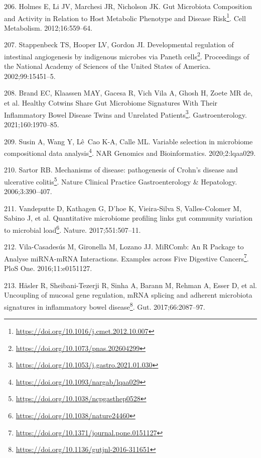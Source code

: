 \documentclass[
  a4paper,
]{book}
\DeclareRobustCommand{\href}[2]{#2\footnote{\url{#1}}}
\newlength{\cslhangindent}
\newlength{\cslentryspacingunit} %
\newenvironment{CSLReferences}[2] %
 {%
  \setlength{\parindent}{0pt}
  \ifodd #1
  \let\oldpar\par
  \def\par{\hangindent=\cslhangindent\oldpar}
  \fi
  \setlength{\parskip}{#2\cslentryspacingunit}
 }%
 {}
\begin{document}
\begin{CSLReferences}{0}{0}
\leavevmode{}%
206. Holmes E, Li JV, Marchesi JR, Nicholson JK. \href{https://doi.org/10.1016/j.cmet.2012.10.007}{Gut Microbiota Composition and Activity in Relation to Host Metabolic Phenotype and Disease Risk}. Cell Metabolism. 2012;16:559--64.

\leavevmode{}%
207. Stappenbeck TS, Hooper LV, Gordon JI. \href{https://doi.org/10.1073/pnas.202604299}{Developmental regulation of intestinal angiogenesis by indigenous microbes via Paneth cells}. Proceedings of the National Academy of Sciences of the United States of America. 2002;99:15451--5.

\leavevmode{}%
208. Brand EC, Klaassen MAY, Gacesa R, Vich Vila A, Ghosh H, Zoete MR de, et al. \href{https://doi.org/10.1053/j.gastro.2021.01.030}{Healthy Cotwins Share Gut Microbiome Signatures With Their Inflammatory Bowel Disease Twins and Unrelated Patients}. Gastroenterology. 2021;160:1970--85.

\leavevmode{}%
209. Susin A, Wang Y, Lê~Cao K-A, Calle ML. \href{https://doi.org/10.1093/nargab/lqaa029}{Variable selection in microbiome compositional data analysis}. NAR Genomics and Bioinformatics. 2020;2:lqaa029.

\leavevmode{}%
210. Sartor RB. \href{https://doi.org/10.1038/ncpgasthep0528}{Mechanisms of disease: pathogenesis of Crohn's disease and ulcerative colitis}. Nature Clinical Practice Gastroenterology \& Hepatology. 2006;3:390--407.

\leavevmode{}%
211. Vandeputte D, Kathagen G, D'hoe K, Vieira-Silva S, Valles-Colomer M, Sabino J, et al. \href{https://doi.org/10.1038/nature24460}{Quantitative microbiome profiling links gut community variation to microbial load}. Nature. 2017;551:507--11.

\leavevmode{}%
212. Vila-Casadesús M, Gironella M, Lozano JJ. \href{https://doi.org/10.1371/journal.pone.0151127}{MiRComb: An R Package to Analyse miRNA-mRNA Interactions. Examples across Five Digestive Cancers}. PloS One. 2016;11:e0151127.

\leavevmode{}%
213. Häsler R, Sheibani-Tezerji R, Sinha A, Barann M, Rehman A, Esser D, et al. \href{https://doi.org/10.1136/gutjnl-2016-311651}{Uncoupling of mucosal gene regulation, mRNA splicing and adherent microbiota signatures in inflammatory bowel disease}. Gut. 2017;66:2087--97.


\end{CSLReferences}
\end{document}
